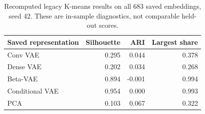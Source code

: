 \begin{table}[htbp]
\centering
\caption{Recomputed legacy K-means results on all 683 saved embeddings, seed 42. These are in-sample diagnostics, not comparable held-out scores.}
\label{tab:legacy}
\small
\begin{tabular}{lrrr}
\toprule
Saved representation & Silhouette & ARI & Largest share \\
\midrule
Conv VAE & 0.295 & 0.044 & 0.378 \\
Dense VAE & 0.202 & 0.034 & 0.268 \\
Beta-VAE & 0.894 & -0.001 & 0.994 \\
Conditional VAE & 0.954 & 0.000 & 0.993 \\
PCA & 0.103 & 0.067 & 0.322 \\
\bottomrule
\end{tabular}
\end{table}
